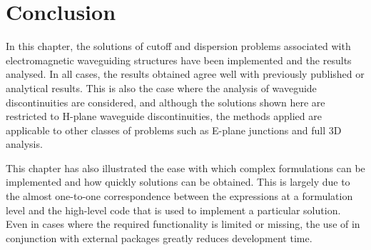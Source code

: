 \section{Conclusion}
In this chapter, the solutions of cutoff and dispersion problems
associated with electromagnetic waveguiding structures have been
implemented and the results analysed. In all cases, the results
obtained agree well with previously published or analytical
results. This is also the case where the analysis of waveguide
discontinuities are considered, and although the solutions shown here
are restricted to H-plane waveguide discontinuities, the methods
applied are applicable to other classes of problems such as E-plane
junctions and full 3D analysis.

This chapter has also illustrated the ease with which complex
formulations can be implemented and how quickly solutions can be
obtained. This is largely due to the almost one-to-one correspondence
between the expressions at a formulation level and the high-level code
that is used to implement a particular solution. Even in cases where
the required functionality is limited or missing, the use of \fenics{}
in conjunction with external packages greatly reduces development
time.
